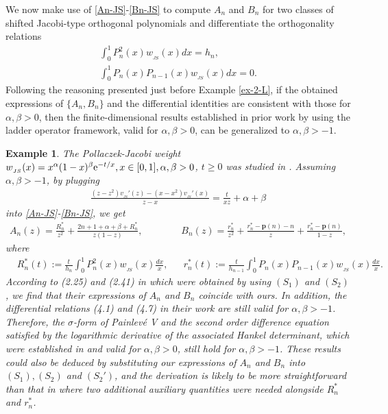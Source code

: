 \documentclass[12pt,a4paper]{article}    %
\newcommand{\e}{{\rm e}}
\newtheorem{exm}{Example}
\numberwithin{equation}{section}
\begin{document}
 We now make use of \eqref{An-JS}-\eqref{Bn-JS} to compute $A_n$ and $B_n$ for two classes of shifted Jacobi-type orthogonal polynomials and differentiate the orthogonality relations
 \begin{gather}	
 \int_{0}^{1}P_n^2(x)w_{_{JS}}(x)dx=h_n,\label{or-Pn2-JS}\\
 \int_{0}^{1}P_n(x)P_{n-1}(x)w_{_{JS}}(x)dx=0.\label{or-Pnn-1-JS}
\end{gather}
Following the reasoning presented just before Example \ref{ex-2-L}, if the obtained expressions of $\{A_n,B_n\}$ and the differential identities are consistent with those for $\alpha,\beta>0$, then the finite-dimensional results established in prior work by using the ladder operator framework, valid for $\alpha,\beta>0$, can be generalized to $\alpha,\beta>-1$.
	
\begin{exm}\label{exJS-1}
The Pollaczek-Jacobi weight $w_{_{JS}}(x)=x^{\alpha}(1-x)^{\beta}\e^{-t/x},x\in[0,1],\alpha,\beta>0$, $t\geq0$ was studied in \cite{CD10}. Assuming $\alpha,\beta>-1$, by plugging
\begin{align*}
\frac{(z-z^2)v_{_{JS}}'(z)-(x-x^2)v_{_{JS}}'(x)}{z-x}=\frac{t}{xz}+\alpha+\beta
\end{align*}
into \eqref{An-JS}-\eqref{Bn-JS}, we get
\begin{align*}
A_n(z)=\frac{R_n^*}{z^2}+\frac{2n+1+\alpha+\beta+R_n^*}{z(1-z)},\qquad\qquad B_n(z)=\frac{r_n^*}{z^2}+\frac{r_n^*-\mathbf{p}(n)-n}{z}+\frac{r_n^*-\mathbf{p}(n)}{1-z},
\end{align*}
where
\begin{align*}
&R_n^*(t):=\frac{t}{h_n}\int_{0}^1 P_n^2(x)w_{_{JS}}(x)\frac{dx}{x},& &r_n^*(t):=\frac{t}{h_{n-1}}\int_{0}^1P_{n}(x)P_{n-1}(x)w_{_{JS}}(x)\frac{dx}{x}.
\end{align*}
According to (2.25) and (2.41) in \cite{CD10} which were obtained by using $(S_1)$ and $(S_2)$, we find that their expressions of $A_n$ and $B_n$ coincide with ours.
In addition, the differential relations (4.1) and (4.7) in their work are still valid for $\alpha,\beta>-1$. Therefore, the $\sigma$-form of Painlev\'{e} V and the second order difference equation satisfied by the logarithmic derivative of the associated Hankel determinant, which were established in \cite{CD10} and valid for $\alpha,\beta>0$, still hold for $\alpha,\beta>-1$. These results could also be deduced by substituting our expressions of $A_n$ and $B_n$ into $(S_1), (S_2)$ and $(S_2')$, and the derivation is likely to be more straightforward than that in \cite{CD10} where two additional auxiliary quantities were needed alongside $R_n^*$ and $r_n^*$.
\end{exm}
\end{document}
